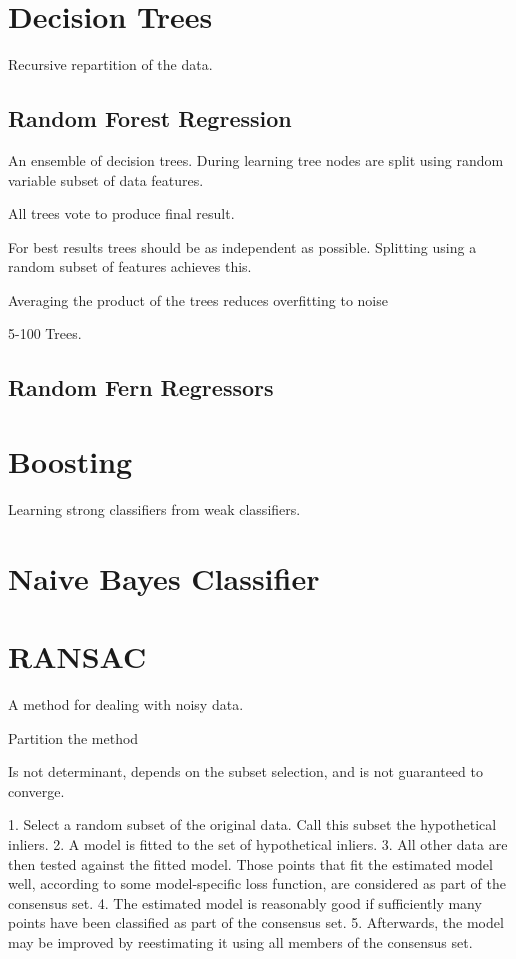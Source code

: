 \section{Decision Trees}
Recursive repartition of the data. 

\subsection{Random Forest Regression}

An ensemble of decision trees. During learning tree nodes are split using random variable subset of data features.

All trees vote to produce final result.

For best results trees should be as independent as possible. Splitting using a random subset of features achieves this.

Averaging the product of the trees reduces overfitting to noise

5-100 Trees.

\subsection{Random Fern Regressors}


\section{Boosting}

Learning strong classifiers from weak classifiers.

\section{Naive Bayes Classifier}


\section{RANSAC}

A method for dealing with noisy data. 

Partition the method 

Is not determinant, depends on the subset selection, and is not guaranteed to converge.

1. Select a random subset of the original data. Call this subset the hypothetical inliers.
2. A model is fitted to the set of hypothetical inliers.
3. All other data are then tested against the fitted model. Those points that fit the estimated model well, according to some model-specific loss function, are considered as part of the consensus set.
4. The estimated model is reasonably good if sufficiently many points have been classified as part of the consensus set.
5. Afterwards, the model may be improved by reestimating it using all members of the consensus set.

